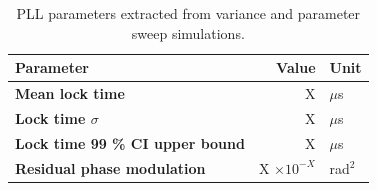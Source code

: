 		\begin{table}[h!]
			\centering
			\def\arraystretch{1.5}		
			\setlength\arrayrulewidth{0.75pt}
			\setlength{\tabcolsep}{1em} %
			\begin{tabular}{|l|r|l|}
				\hline 
				\rule[-1ex]{0pt}{2.5ex} \cellcolor{gray!40}\textbf{Parameter} & \cellcolor{gray!40}\textbf{Value} & \cellcolor{gray!40}\textbf{Unit }\\ 
				\hline 
				\rule[-1ex]{0pt}{2.5ex} \textbf{Mean lock time}  & X& $\mu$s \\
				\hline 
				\rule[-1ex]{0pt}{2.5ex} \textbf{Lock time $\sigma$} &X & $\mu$s\\ 
				\hline 
				\rule[-1ex]{0pt}{2.5ex} \textbf{Lock time 99 \% CI upper bound} & X & $\mu$s\\
				\hline 
				\rule[-1ex]{0pt}{2.5ex} \textbf{Residual phase modulation} & X $\times10^{-X}$ & rad$^2$\\ 
				\hline 
			\end{tabular} 

			\caption{PLL parameters extracted from variance and parameter sweep simulations.}
			\label{simulation_params_fast}
		\end{table}






